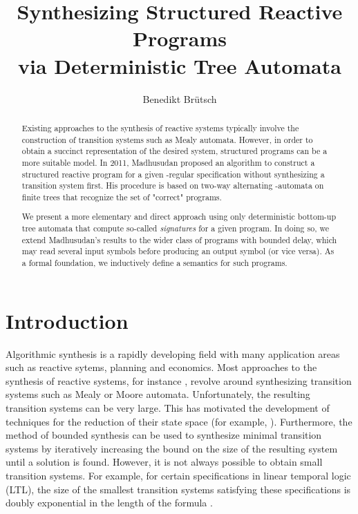 \documentclass[submission,copyright,creativecommons]{eptcs}
\title{Synthesizing Structured Reactive Programs \\ via Deterministic Tree Automata}
\author{Benedikt Brütsch
	\institute{RWTH Aachen University, Lehrstuhl für Informatik 7, Germany}
	\email{bruetsch@automata.rwth-aachen.de}
}
\newcommand{\ignore}[1]{}
\begin{document}
\maketitle


\begin{abstract}
Existing approaches to the synthesis of reactive systems typically involve the
construction of transition systems such as Mealy automata.
However, in order to obtain a succinct representation of the desired system,
structured programs can be a more suitable model.
In 2011, Madhusudan proposed an algorithm to construct a structured
reactive program for a given -regular specification without
synthesizing a transition system first.
His procedure is based on two-way alternating -automata on finite
trees that recognize the set of "correct" programs.

We present a more elementary and direct approach using only deterministic
bottom-up tree automata that compute so-called \emph{signatures}
for a given program.
In doing so, we extend Madhusudan's results to the wider class
of programs with bounded delay, which may read several input symbols before
producing an output symbol (or vice versa).
As a formal foundation, we inductively define a semantics for such programs.
\end{abstract}

\vspace{2mm}
\section{Introduction}

Algorithmic synthesis is a rapidly developing field with many application
areas such as reactive sytems, planning and economics.
Most approaches to the synthesis of reactive systems, for instance
\cite{buchi_solving_1969,Rabin:1972:AIO:540412,DBLP:conf/popl/PnueliR89,kupferman_churchs_1999},
revolve around synthesizing transition systems such as Mealy or Moore
automata.
Unfortunately, the resulting transition systems can be very large.
This has motivated the development of techniques for the reduction of their
state space (for example, \cite{DBLP:journals/corr/abs-1102-4120}).
Furthermore, the method of bounded synthesis
\cite{schewe_bounded_2007,ehlers_symbolic_2010} can be used to synthesize
minimal transition systems by iteratively increasing the bound on the size
of the resulting system until a solution is found.\ignore{TODO: Is this an appropriate description?}
However, it is not always possible to obtain small transition systems.
For example, for certain specifications in linear temporal logic
(LTL), the size of the smallest transition systems satisfying these
specifications is doubly exponential in the length of the formula
\cite{rosner}.
\end{document}
